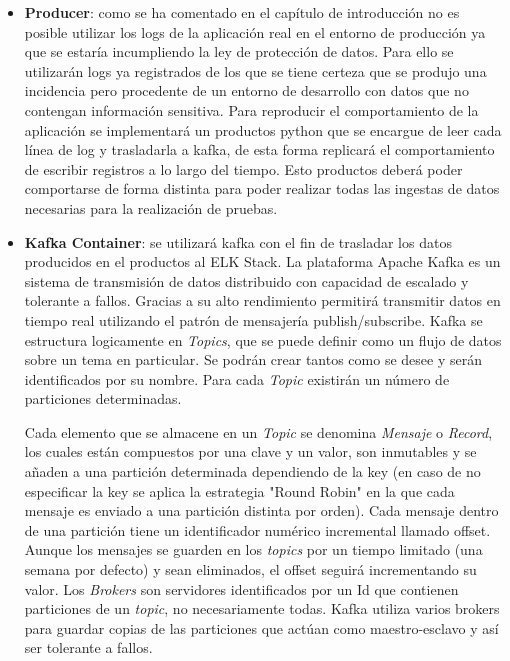 \begin{itemize}
\item \textbf{Producer}: como se ha comentado en el capítulo de introducción no es posible utilizar los logs de la aplicación real en el entorno de producción ya que se estaría incumpliendo la ley de protección de datos. Para ello se utilizarán logs ya registrados de los que se tiene certeza que se produjo una incidencia pero procedente de un entorno de desarrollo con datos que no contengan información sensitiva. Para reproducir el comportamiento de la aplicación se implementará un productos python que se encargue de leer cada línea de log y trasladarla a kafka, de esta forma replicará el comportamiento de escribir registros a lo largo del tiempo. Esto productos deberá poder comportarse de forma distinta para poder realizar todas las ingestas de datos necesarias para la realización de pruebas.

\item \textbf{Kafka Container}: se utilizará kafka con el fin de trasladar los datos producidos en el productos al ELK Stack. La plataforma Apache Kafka es un sistema de transmisión de datos distribuido con capacidad de escalado y tolerante a fallos. Gracias a su alto rendimiento permitirá transmitir datos en tiempo real utilizando el patrón de mensajería publish/subscribe. Kafka se estructura logicamente en \textit{Topics}, que se puede definir como un flujo de datos sobre un tema en particular. Se podrán crear tantos como se desee y serán identificados por su nombre. Para cada \textit{Topic} existirán un número de particiones determinadas.

Cada elemento que se almacene en un \textit{Topic} se denomina \textit{Mensaje} o \textit{Record}, los cuales están compuestos por una clave y un valor, son inmutables y se añaden a una partición determinada dependiendo de la key (en caso de no especificar la key se aplica la estrategia "Round Robin" en la que cada mensaje es enviado a una partición distinta por orden). Cada mensaje dentro de una partición tiene un identificador numérico incremental llamado offset. Aunque los mensajes se guarden en los \textit{topics} por un tiempo limitado (una semana por defecto) y sean eliminados, el offset seguirá incrementando su valor. Los \textit{Brokers} son servidores identificados por un Id que contienen particiones de un \textit{topic}, no necesariamente todas. Kafka utiliza varios brokers para guardar copias de las particiones que actúan como maestro-esclavo y así ser tolerante a fallos. 


\end{itemize}
